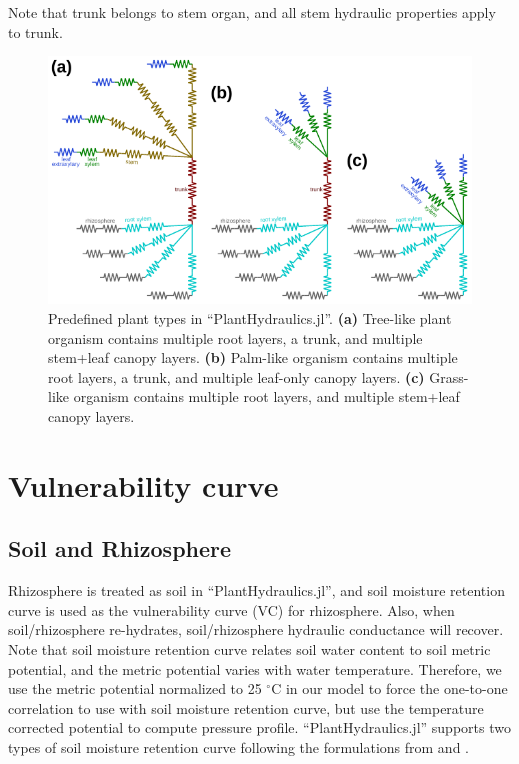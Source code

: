 \documentclass[twoside,10pt]{report}
\begin{document}
\par \noindent Note that trunk belongs to stem organ, and all stem hydraulic properties apply to trunk.

\begin{figure}[ht]
    \includegraphics[width=12cm]{YW_figures/hydraulic_systems}
    \caption{Predefined plant types in ``PlantHydraulics.jl''. \textbf{(a)} Tree-like plant organism contains multiple root layers, a trunk, and multiple stem+leaf canopy layers. \textbf{(b)} Palm-like organism contains multiple root layers, a trunk, and multiple leaf-only canopy layers. \textbf{(c)} Grass-like organism contains multiple root layers, and multiple stem+leaf canopy layers.}
    \label{fig:hydraulic_systems}
\end{figure}




\section{Vulnerability curve}

\subsection{Soil and Rhizosphere}
\par Rhizosphere is treated as soil in ``PlantHydraulics.jl'', and soil moisture retention curve is used as the vulnerability curve (VC) for rhizosphere. Also, when soil/rhizosphere re-hydrates, soil/rhizosphere hydraulic conductance will recover. Note that soil moisture retention curve relates soil water content to soil metric potential, and the metric potential varies with water temperature. Therefore, we use the metric potential normalized to 25 $^\circ$C in our model to force the one-to-one correlation to use with soil moisture retention curve, but use the temperature corrected potential to compute pressure profile. ``PlantHydraulics.jl'' supports two types of soil moisture retention curve following the formulations from \cite{brooks1964hydraulic} and \cite{van1980closed}.
\end{document}
